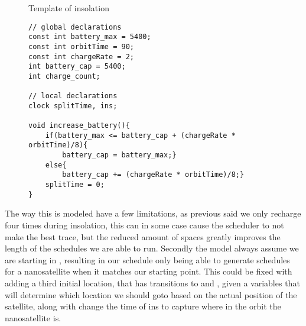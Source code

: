 \begin{figure}
	\centering
	\caption{Template of insolation}
	\label{fig:cora_inso}
\end{figure}

\begin{figure}
	\begin{lstlisting}[language=my_c, caption={Declarations and function}, label=lst:insolation_code]
// global declarations
const int battery_max = 5400;
const int orbitTime = 90;
const int chargeRate = 2;
int battery_cap = 5400;
int charge_count;

// local declarations
clock splitTime, ins;

void increase_battery(){
	if(battery_max <= battery_cap + (chargeRate * orbitTime)/8){
		battery_cap = battery_max;}
	else{
		battery_cap += (chargeRate * orbitTime)/8;}
	splitTime = 0;
}
	\end{lstlisting}
\end{figure}

The way this is modeled have a few limitations, as previous said we only recharge four times during insolation, this can in some case cause the scheduler to not make the best trace, but the reduced amount of spaces greatly improves the length of the schedules we are able to run. Secondly the model always assume we are starting in , resulting in our schedule only being able to generate schedules for a nanosatellite when it matches our starting point. This could be fixed with adding a third initial location, that has transitions to  and , given a variables that will determine which location we should goto based on the actual position of the satellite, along with change the time of ins to capture where in the orbit the nanosatellite is. 


